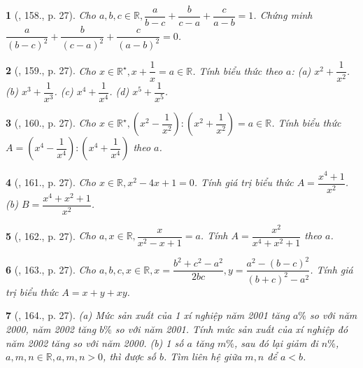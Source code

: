 \documentclass{article}
\newtheorem{baitoan}{}
\begin{document}
\begin{baitoan}[\cite{Binh_Toan_8_tap_1}, 158., p. 27]
	Cho $a,b,c\in\mathbb{R},\dfrac{a}{b - c} + \dfrac{b}{c - a} + \dfrac{c}{a - b} = 1$. Chứng minh $\dfrac{a}{(b - c)^2} + \dfrac{b}{(c - a)^2} + \dfrac{c}{(a - b)^2} = 0$.
\end{baitoan}

\begin{baitoan}[\cite{Binh_Toan_8_tap_1}, 159., p. 27]
	Cho $x\in\mathbb{R}^\star,x + \dfrac{1}{x} = a\in\mathbb{R}$. Tính biểu thức theo $a$: (a) $x^2 + \dfrac{1}{x^2}$. (b) $x^3 + \dfrac{1}{x^3}$. (c) $x^4 + \dfrac{1}{x^4}$. (d) $x^5 + \dfrac{1}{x^5}$.
\end{baitoan}

\begin{baitoan}[\cite{Binh_Toan_8_tap_1}, 160., p. 27]
	Cho $x\in\mathbb{R}^\star,\left(x^2 - \dfrac{1}{x^2}\right):\left(x^2 + \dfrac{1}{x^2}\right) = a\in\mathbb{R}$. Tính biểu thức $A = \left(x^4 - \dfrac{1}{x^4}\right):\left(x^4 + \dfrac{1}{x^4}\right)$ theo $a$.
\end{baitoan}

\begin{baitoan}[\cite{Binh_Toan_8_tap_1}, 161., p. 27]
	Cho $x\in\mathbb{R},x^2 - 4x + 1 = 0$. Tính giá trị biểu thức $A = \dfrac{x^4 + 1}{x^2}$. (b) $B = \dfrac{x^4 + x^2 + 1}{x^2}$.
\end{baitoan}

\begin{baitoan}[\cite{Binh_Toan_8_tap_1}, 162., p. 27]
	Cho $a,x\in\mathbb{R},\dfrac{x}{x^2 - x + 1} = a$. Tính $A = \dfrac{x^2}{x^4 + x^2 + 1}$ theo $a$.
\end{baitoan}

\begin{baitoan}[\cite{Binh_Toan_8_tap_1}, 163., p. 27]
	Cho $a,b,c,x\in\mathbb{R},x = \dfrac{b^2 + c^2 - a^2}{2bc},y = \dfrac{a^2 - (b - c)^2}{(b + c)^2 - a^2}$. Tính giá trị biểu thức $A =  x + y + xy$.
\end{baitoan}

\begin{baitoan}[\cite{Binh_Toan_8_tap_1}, 164., p. 27]
	(a) Mức sản xuất của 1 xí nghiệp năm 2001 tăng $a\%$ so với năm 2000, năm 2002 tăng $b\%$ so với năm 2001. Tính mức sản xuất của xí nghiệp đó năm 2002 tăng so với năm 2000. (b) 1 số $a$ tăng $m\%$, sau đó lại giảm đi $n\%$, $a,m,n\in\mathbb{R},a,m,n > 0$, thì được số $b$. Tìm liên hệ giữa $m,n$ để $a < b$.
\end{baitoan}
\end{document}
